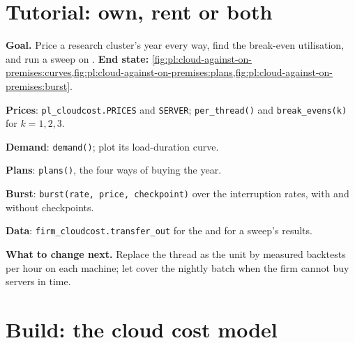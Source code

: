 \section{Tutorial: own, rent or both}\label{tut:pl:cloud-against-on-premises:tut}

\begin{tutorial}
\textbf{Goal.} Price a research cluster's year every way, find the break-even utilisation, and run a sweep on .
\textbf{End state:} \cref{fig:pl:cloud-against-on-premises:curves,fig:pl:cloud-against-on-premises:plans,fig:pl:cloud-against-on-premises:burst}.
\begin{tutsteps}
\item \textbf{Prices}: \texttt{pl\_cloudcost.PRICES} and \texttt{SERVER}; \texttt{per\_thread()} and \texttt{break\_evens(k)} for
$k=1,2,3$.
\item \textbf{Demand}: \texttt{demand()}; plot its load-duration curve.
\item \textbf{Plans}: \texttt{plans()}, the four ways of buying the year.
\item \textbf{Burst}: \texttt{burst(rate, price, checkpoint)} over the interruption rates, with and without checkpoints.
\item \textbf{Data}: \texttt{firm\_cloudcost.transfer\_out} for the  and for a sweep's results.
\end{tutsteps}
\textbf{What to change next.} Replace the thread as the unit by measured backtests per hour on each machine; let  cover the
nightly batch when the firm cannot buy servers in time.
\end{tutorial}

\section{Build: the cloud cost model}\label{bld:pl:cloud-against-on-premises:cloudcost}

